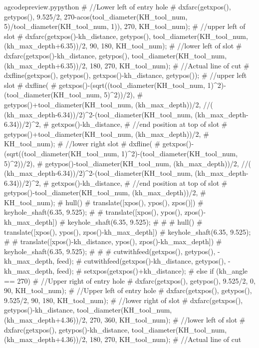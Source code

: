 \documentclass{ltxdoc}
\begin{document}
\begin{writecode}{a}{gcodepreview.py}{python}
{#    //Lower left of entry hole
#    dxfarc(getxpos(), getypos(), 9.525/2, 270-acos(tool_diameter(KH_tool_num, 5)/tool_diameter(KH_tool_num, 1)), 270, KH_tool_num);
#    //upper left of slot
#    dxfarc(getxpos()-kh_distance, getypos(), tool_diameter(KH_tool_num, (kh_max_depth+6.35))/2, 90, 180, KH_tool_num);
#    //lower left of slot
#    dxfarc(getxpos()-kh_distance, getypos(), tool_diameter(KH_tool_num, (kh_max_depth+6.35))/2, 180, 270, KH_tool_num);
#    //Actual line of cut
#    dxfline(getxpos(), getypos(), getxpos()-kh_distance, getypos());
#    //upper left slot
#    dxfline(
#        getxpos()-(sqrt((tool_diameter(KH_tool_num, 1)^2)-(tool_diameter(KH_tool_num, 5)^2))/2), 
#        getypos()+tool_diameter(KH_tool_num, (kh_max_depth))/2, //( (kh_max_depth-6.34))/2)^2-(tool_diameter(KH_tool_num, (kh_max_depth-6.34))/2)^2, 
#        getxpos()-kh_distance, 
#    //end position at top of slot
#        getypos()+tool_diameter(KH_tool_num, (kh_max_depth))/2, 
#        KH_tool_num);
#    //lower right slot
#    dxfline(
#        getxpos()-(sqrt((tool_diameter(KH_tool_num, 1)^2)-(tool_diameter(KH_tool_num, 5)^2))/2), 
#        getypos()-tool_diameter(KH_tool_num, (kh_max_depth))/2, //( (kh_max_depth-6.34))/2)^2-(tool_diameter(KH_tool_num, (kh_max_depth-6.34))/2)^2, 
#        getxpos()-kh_distance, 
#    //end position at top of slot
#        getypos()-tool_diameter(KH_tool_num, (kh_max_depth))/2, 
#        KH_tool_num);
#    hull(){
#      translate([xpos(), ypos(), zpos()]){
#        keyhole_shaft(6.35, 9.525);
#      }
#      translate([xpos(), ypos(), zpos()-kh_max_depth]){
#        keyhole_shaft(6.35, 9.525);
#      }
#    }
#    hull(){
#      translate([xpos(), ypos(), zpos()-kh_max_depth]){
#        keyhole_shaft(6.35, 9.525);
#      }
#      translate([xpos()-kh_distance, ypos(), zpos()-kh_max_depth]){
#        keyhole_shaft(6.35, 9.525);
#      }
#    }
#    cutwithfeed(getxpos(), getypos(), -kh_max_depth, feed);
#    cutwithfeed(getxpos()-kh_distance, getypos(), -kh_max_depth, feed);
#    setxpos(getxpos()+kh_distance);
#  } else if (kh_angle == 270) {
#    //Upper right of entry hole
#    dxfarc(getxpos(), getypos(), 9.525/2, 0, 90, KH_tool_num);
#    //Upper left of entry hole
#    dxfarc(getxpos(), getypos(), 9.525/2, 90, 180, KH_tool_num);
#    //lower right of slot
#    dxfarc(getxpos(), getypos()-kh_distance, tool_diameter(KH_tool_num, (kh_max_depth+4.36))/2, 270, 360, KH_tool_num);
#    //lower left of slot
#    dxfarc(getxpos(), getypos()-kh_distance, tool_diameter(KH_tool_num, (kh_max_depth+4.36))/2, 180, 270, KH_tool_num);
#    //Actual line of cut
}
\end{writecode}
\end{document}
